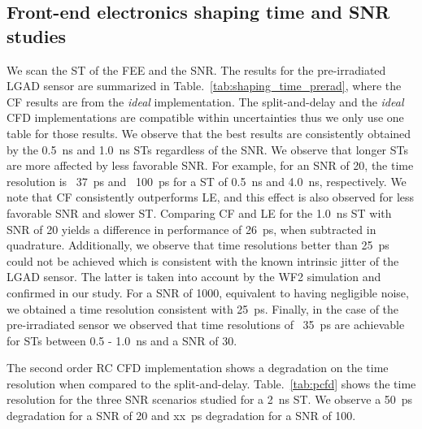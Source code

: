 \documentclass[preprint,1p]{elsarticle}
\begin{document}
\subsection{Front-end electronics shaping time and SNR studies}\label{sec:shaping_time}
We scan the ST of the FEE and the SNR. The results for the pre-irradiated LGAD sensor are summarized in Table.~\ref{tab:shaping_time_prerad},
where the CF results are from the \textit{ideal} implementation. The {\color{red} split-and-delay}
 and the \textit{ideal} CFD implementations are compatible within uncertainties thus we only use one table for those results.
 We observe that the best results are consistently obtained by the 0.5~\si{ns} and 1.0~\si{ns} STs regardless of the SNR. We observe that
 longer STs are more affected by less favorable SNR. For example, for an SNR of 20, the time resolution is ~37~\si{ps} and ~100~\si{ps} for a
ST of 0.5~\si{ns} and 4.0~\si{ns}, respectively. We note that CF consistently outperforms LE, and this effect is also observed
 for less favorable SNR and slower ST. Comparing CF and LE for the 1.0~\si{ns} ST with SNR of 20 yields a difference in performance of
 26~\si{ps}, when subtracted in quadrature. Additionally, we observe that time resolutions better than 25~\si{ps} could not be achieved which
 is consistent with the known intrinsic jitter of the LGAD sensor. The latter is taken into account by the WF2 simulation and
confirmed in our study. For a SNR of 1000, equivalent to having negligible noise, we obtained a time resolution consistent with 25~\si{ps}.
Finally, in the case of the pre-irradiated sensor we observed that time resolutions of ~35~\si{ps} are achievable for
STs between 0.5 - 1.0~\si{ns} and a SNR of 30.

The {\color{red} second order RC} CFD implementation shows a degradation on the time resolution when compared
to the {\color{red} split-and-delay}. Table.~\ref{tab:pcfd} shows the time resolution for the three SNR scenarios
studied for a 2~\si{ns} ST. We observe a 50~\si{ps} degradation for a SNR of 20 and  xx~\si{ps} degradation for a SNR of 100.
\end{document}
